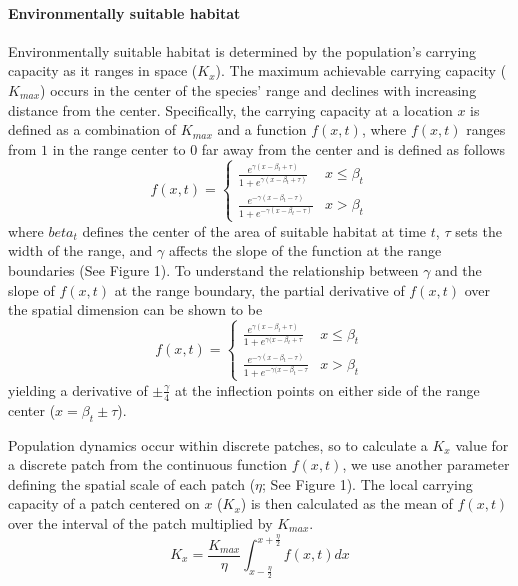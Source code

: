 \documentclass[11pt, oneside]{article}
\begin{document}
\paragraph{Environmentally suitable habitat}
Environmentally suitable habitat is determined by the population's carrying capacity as it ranges in space ($K_{x}$). The maximum achievable carrying capacity ($K_{max}$) occurs in the center of the species' range and declines with increasing distance from the center. Specifically, the carrying capacity at a location $x$ is defined as a combination of $K_{max}$ and a function $f(x,t)$, where $f(x,t)$ ranges from $1$ in the range center to $0$ far away from the center and is defined as follows 
\begin{equation}
f(x,t)=
\begin{cases}
	\frac{e^{\gamma(x-\beta_{t}+\tau)}}{1+e^{\gamma(x-\beta_{t}+\tau)}} & x \leq \beta_{t} \\
	\frac{e^{-\gamma(x-\beta_{t}-\tau)}}{1+e^{-\gamma(x-\beta_{t}-\tau)}} & x > \beta_{t}
\end{cases}
\end{equation}
where $beta_{t}$ defines the center of the area of suitable habitat at time $t$, $\tau$ sets the width of the range, and $\gamma$ affects the slope of the function at the range boundaries (See Figure 1). To understand the relationship between $\gamma$ and the slope of $f(x,t)$ at the range boundary, the partial derivative of $f(x,t)$ over the spatial dimension can be shown to be
\begin{equation}
f(x,t)=
\begin{cases}
	\frac{e^{\gamma(x-\beta_{t}+\tau)}}{1+e^{\gamma(x-\beta_{t}+\tau}} & x \leq \beta_{t} \\
	\frac{e^{-\gamma(x-\beta_{t}-\tau)}}{1+e^{-\gamma(x-\beta_{t}-\tau}} & x > \beta_{t}
\end{cases}	
\end{equation}
yielding a derivative of $\pm\frac{\gamma}{4}$ at the inflection points on either side of the range center ($x=\beta_{t}\pm\tau$).

Population dynamics occur within discrete patches, so to calculate a $K_{x}$ value for a discrete patch from the continuous function $f(x,t)$, we use another parameter defining the spatial scale of each patch ($\eta$; See Figure 1). The local carrying capacity of a patch centered on $x$ ($K_{x}$) is then calculated as the mean of $f(x,t)$ over the interval of the patch multiplied by $K_{max}$.
\begin{equation}
K_{x} = \frac{K_{max}}{\eta}\int_{x-\frac{\eta}{2}}^{x+\frac{\eta}{2}}f(x,t)dx
\end{equation}
\end{document}
